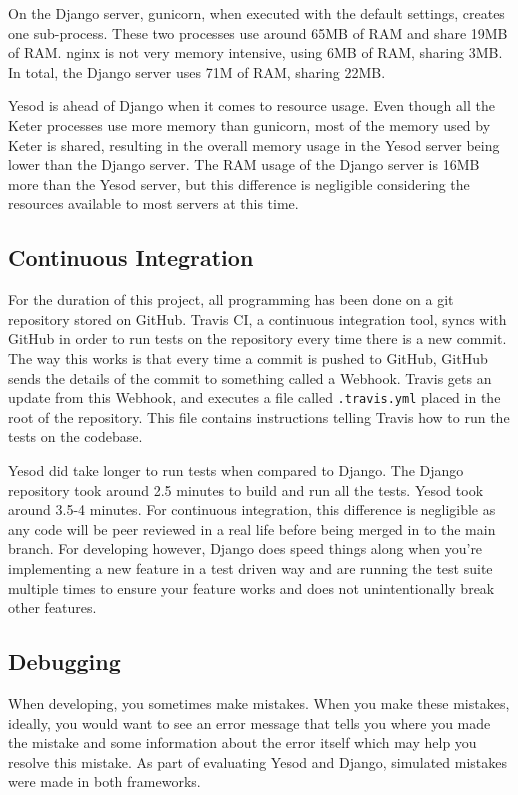 On the Django server, gunicorn, when executed with the default settings, creates
one sub-process. These two processes use around 65MB of RAM and share 19MB
of RAM. nginx is not very memory intensive, using 6MB of RAM, sharing 3MB.
In total, the Django server uses 71M of RAM, sharing 22MB.

Yesod is ahead of Django when it comes to resource usage. Even though all the
Keter processes use more memory than gunicorn, most of the memory used by Keter
is shared, resulting in the overall memory usage in the Yesod server being lower
than the Django server. The RAM usage of the Django server is 16MB more than
the Yesod server, but this difference is negligible considering the resources
available to most servers at this time.

\subsection{Continuous Integration}

For the duration of this project, all programming has been done on a git
repository stored on GitHub. Travis CI, a continuous integration tool,
syncs with GitHub in order to run tests on the repository every time
there is a new commit. The way this works is that every time a commit
is pushed to GitHub, GitHub sends the details of the commit to something
called a Webhook. Travis gets an update from this Webhook, and executes
a file called \texttt{.travis.yml} placed in the root of the repository.
This file contains instructions telling Travis how to run the tests
on the codebase.

Yesod did take longer to run tests when compared to Django. The Django
repository took around 2.5 minutes to build and run all the tests. Yesod
took around 3.5-4 minutes. For continuous integration, this difference
is negligible as any code will be peer reviewed in a real life before being
merged in to the main branch. For developing however, Django does speed
things along when you're implementing a new feature in a test driven way
and are running the test suite multiple times to ensure your feature
works and does not unintentionally break other features.

\subsection{Debugging}

When developing, you sometimes make mistakes. When you make these mistakes,
ideally, you would want to see an error message that tells you where you
made the mistake and some information about the error itself which may
help you resolve this mistake. As part of evaluating Yesod and Django,
simulated mistakes were made in both frameworks.

